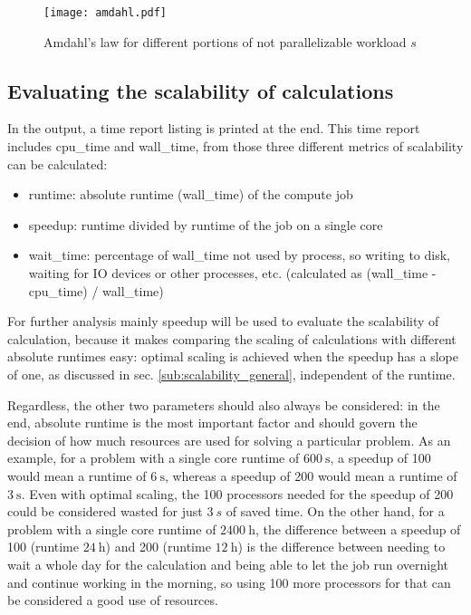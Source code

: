 \documentclass[main.tex]{subfiles}
\begin{document}
\begin{figure}[ht!]
    \centering
    \texttt{[image: amdahl.pdf]}
    \label{fig:amdahl}
    \caption{Amdahl's law for different portions of not parallelizable workload \(s\)}
\end{figure}

\subsection{Evaluating the scalability of \QE calculations}\label{sub:scalability_qe}

In the \QE output, a time report listing is printed at the end.
This time report includes \gls{cpu_time} and \gls{wall_time}, from those three different metrics of scalability can be calculated:
\begin{itemize}
    \item runtime: absolute runtime (\gls{wall_time}) of the compute job
    \item speedup: runtime divided by runtime of the job on a single core
    \item \gls{wait_time}: percentage of \gls{wall_time} not used by \QE process, so writing to disk, waiting for IO devices or other processes, etc. (calculated as (\gls{wall_time} - \gls{cpu_time}) / \gls{wall_time})
\end{itemize}
For further analysis mainly speedup will be used to evaluate the scalability of \QE calculation, because it makes comparing the scaling of calculations with different absolute runtimes easy: optimal scaling is achieved when the speedup has a slope of one, as discussed in sec. \ref{sub:scalability_general}, independent of the runtime.

Regardless, the other two parameters should also always be considered: in the end, absolute runtime is the most important factor and should govern the decision of how much resources are used for solving a particular problem.
As an example, for a problem with a single core runtime of \(\SI{600}{\s}\), a speedup of 100 would mean a runtime of \(\SI{6}{\s}\), whereas a speedup of 200 would mean a runtime of \(\SI{3}{\s}\).
Even with optimal scaling, the 100 processors needed for the speedup of 200 could be considered wasted for just \(\SI{3}{s}\) of saved time.
On the other hand, for a problem with a single core runtime of \(\SI{2400}{\hour}\), the difference between a speedup of 100 (runtime \(\SI{24}{\hour}\)) and 200 (runtime \(\SI{12}{\hour}\)) is the difference between needing to wait a whole day for the calculation and being able to let the job run overnight and continue working in the morning, so using 100 more processors for that can be considered a good use of resources.
\end{document}
